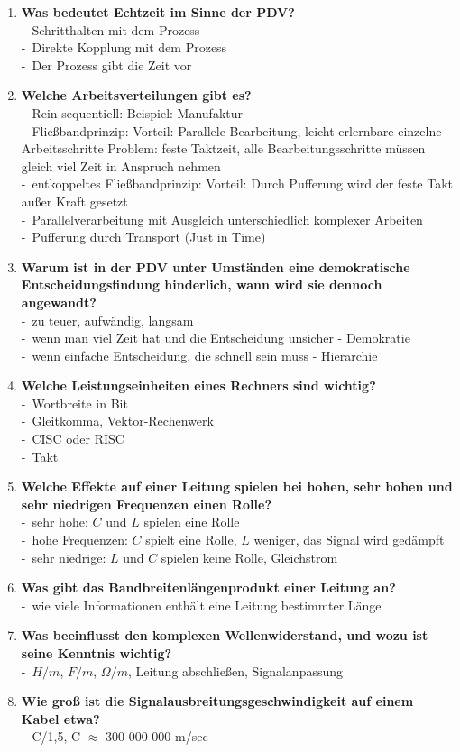 \documentclass[a4paper,12pt]{article}
\newcommand{\questionnopage}[2]{\pagebreak[3]\item {\textbf{#1?}}#2}
\newcommand{\catchword}[1]{\\-\ #1}
\begin{document}
\begin{enumerate}
  \questionnopage{Was bedeutet Echtzeit im Sinne der PDV}
  {
    \catchword{Schritthalten mit dem Prozess}
    \catchword{Direkte Kopplung mit dem Prozess}
    \catchword{Der Prozess gibt die Zeit vor}
  }

  \questionnopage{Welche Arbeitsverteilungen gibt es}
  {
    \catchword{Rein sequentiell: Beispiel: Manufaktur}
    \catchword{Fließbandprinzip: Vorteil: Parallele Bearbeitung,
               leicht erlernbare einzelne Arbeitsschritte Problem: feste Taktzeit, alle
               Bearbeitungsschritte müssen gleich viel Zeit in Anspruch nehmen}
    \catchword{entkoppeltes Fließbandprinzip: Vorteil: Durch Pufferung wird der
               feste Takt außer Kraft gesetzt}
    \catchword{Parallelverarbeitung mit Ausgleich unterschiedlich komplexer Arbeiten}
    \catchword{Pufferung durch Transport (Just in Time)}
  }

  \questionnopage{Warum ist in der PDV unter Umständen eine demokratische 
                  Entscheidungsfindung hinderlich, wann wird sie dennoch angewandt}
  {
    \catchword{zu teuer, aufwändig, langsam}
    \catchword{wenn man viel Zeit hat und die Entscheidung unsicher - Demokratie}
    \catchword{wenn einfache Entscheidung, die schnell sein muss - Hierarchie}
  }

  \questionnopage{Welche Leistungseinheiten eines Rechners sind wichtig}
  {
    \catchword{Wortbreite in Bit}
    \catchword{Gleitkomma, Vektor-Rechenwerk}
    \catchword{CISC oder RISC}
    \catchword{Takt}
  }

  \questionnopage{Welche Effekte auf einer Leitung spielen bei hohen, 
                  sehr hohen und sehr niedrigen Frequenzen einen Rolle}
  {
    \catchword{sehr hohe: $C$ und $L$ spielen eine Rolle}
    \catchword{hohe Frequenzen: $C$ spielt eine Rolle, $L$ weniger,
               das Signal wird gedämpft}
    \catchword{sehr niedrige: $L$ und $C$ spielen keine Rolle, Gleichstrom}
  }

  \questionnopage{Was gibt das Bandbreitenlängenprodukt einer Leitung an}
  {
    \catchword{wie viele Informationen enthält eine Leitung bestimmter Länge}
  }

  \questionnopage{Was beeinflusst den komplexen Wellenwiderstand, und wozu ist 
                  seine Kenntnis wichtig}
  {
    \catchword{$H/m$, $F/m$, $\Omega/m$, Leitung abschließen, Signalanpassung}
  }

  \questionnopage{Wie groß ist die Signalausbreitungsgeschwindigkeit auf einem Kabel etwa}
  {
    \catchword{C/1,5, C $\approx$ 300 000 000 m/sec}
  }


\end{enumerate}
\end{document}
